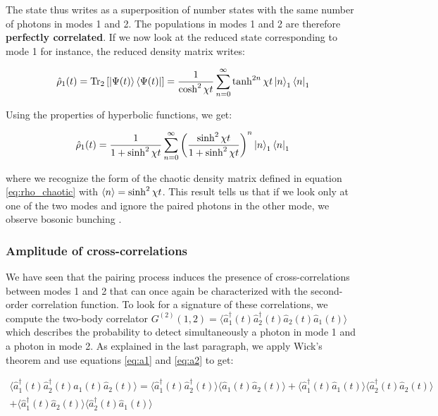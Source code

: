 \noindent The state thus writes as a superposition of number states with the same number of photons in modes 1 and 2. The populations in modes 1 and 2 are therefore \textbf{perfectly correlated}. If we now look at the reduced state corresponding to mode 1 for instance, the reduced density matrix writes:

\begin{equation}
    \hat{\rho}_1 (t) = \mathrm{Tr}_2 \left[ \ket{\Psi(t)} \bra{\Psi(t)} \right] = \frac{1}{\cosh^2 \chi t} \sum_{n=0}^{\infty}\tanh^{2n} \chi t \ket{n}_1 \bra{n}_1
\end{equation}

\noindent Using the properties of hyperbolic functions, we get:

\begin{equation}
 \hat{\rho}_1 (t) = \frac{1}{1+ \sinh^2 \chi t} \sum_{n=0}^{\infty} \left( \frac{\sinh^2 \chi t}{1+\sinh^2 \chi t} \right)^n \ket{n}_1 \bra{n}_1
\end{equation}

\noindent where we recognize the form of the chaotic density matrix defined in equation \ref{eq:rho_chaotic} with $\langle n\rangle = \sinh^2 \chi t$. This result tells us that if we look only at one of the two modes and ignore the paired photons in the other mode, we observe bosonic bunching \cite{yurke1987}.


\subsubsection{Amplitude of cross-correlations}

We have seen that the pairing process induces the presence of cross-correlations between modes 1 and 2 that can once again be characterized with the second-order correlation function. To look for a signature of these correlations, we compute the two-body correlator $G^{(2)}(1,2) =\langle \hat{a}_1^{\dagger}(t) \hat{a}_2^{\dagger}(t) \hat{a}_2(t) \hat{a}_1(t) \rangle$ which describes the probability to detect simultaneously a photon in mode 1 and a photon in mode 2. As explained in the last paragraph, we apply Wick's theorem and use equations \ref{eq:a1} and \ref{eq:a2} to get:

\begin{equation}
\begin{split}
    \langle \hat{a}_1^{\dagger}(t) \hat{a}_2^{\dagger}(t) \hat{a}_1(t) \hat{a}_2(t) \rangle = \langle \hat{a}_1^{\dagger}(t) \hat{a}_2^{\dagger}(t) \rangle \langle \hat{a}_1(t) \hat{a}_2(t) \rangle +  \langle \hat{a}_1^{\dagger}(t) \hat{a}_1(t) \rangle \langle \hat{a}_2^{\dagger}(t) \hat{a}_2(t) \rangle \\
    +  \langle \hat{a}_1^{\dagger}(t) \hat{a}_2(t) \rangle \langle \hat{a}_2^{\dagger}(t) \hat{a}_1(t) \rangle
\end{split}
\label{eq:wick_NDPA}
\end{equation}


